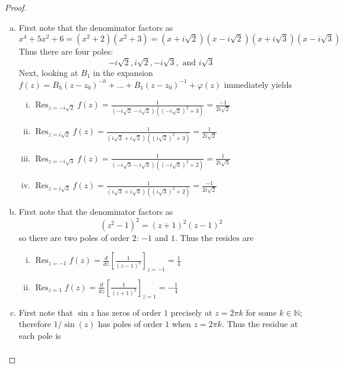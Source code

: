\documentclass{article}
\begin{document}
\begin{proof} \text{} \\
  \begin{enumerate}[(a)]
    \item First note that the denominator factors as \[
      x^4 + 5x^2 + 6 = (x^2 + 2)(x^2 + 3) = (x + i\sqrt{2})(x - i\sqrt{2})(x + i\sqrt{3})(x - i\sqrt{3})
    \] Thus there are four poles: \[
      -i\sqrt{2}, i\sqrt{2}, -i\sqrt{3}, \text{ and } i\sqrt{3}
    \]
    Next, looking at $B_1$ in the expansion
      $f(z) = B_h(z-z_0)^{-h} + \hdots + B_1(z-z_0)^{-1} + \varphi(z)$
    immediately yields \begin{enumerate}[(i)]
      \item $\displaystyle
        \operatorname{Res}_{z=-i\sqrt{2}}f(z)
          = \frac{1}{(-i\sqrt{2} - i\sqrt{2})((-i\sqrt{2})^2 + 3)}
          = \frac{-1}{2i\sqrt{2}}
      $
      \item $\displaystyle
        \operatorname{Res}_{z=i\sqrt{2}}f(z)
          = \frac{1}{(i\sqrt{2} + i\sqrt{2})((i\sqrt{2})^2 + 3)}
          = \frac{1}{2i\sqrt{2}}
      $
      \item $\displaystyle
        \operatorname{Res}_{z=-i\sqrt{3}}f(z)
          = \frac{1}{(-i\sqrt{3} - i\sqrt{3})((-i\sqrt{3})^2 + 2)}
          = \frac{1}{2i\sqrt{3}}
      $
      \item $\displaystyle
        \operatorname{Res}_{z=i\sqrt{3}}f(z)
          = \frac{1}{(i\sqrt{3} + i\sqrt{3})((i\sqrt{3})^2 + 2)}
          = \frac{-1}{2i\sqrt{2}}
      $
    \end{enumerate}
    \item First note that the denominator factors as \[
      (z^2 - 1)^2 = (z + 1)^2(z-1)^2
    \] so there are two poles of order $2$: $-1$ and $1$. Thus the resides are
    \begin{enumerate}[(i)]
      \item $\displaystyle
        \operatorname{Res}_{z=-1}f(z)
        = \frac{d}{dz}\left[\frac{1}{(z - 1)^2}\right]_{z = -1}
        = \frac{1}{4}
      $
      \item $\displaystyle
        \operatorname{Res}_{z=1}f(z)
        = \frac{d}{dz}\left[\frac{1}{(z + 1)^2}\right]_{z = 1}
        = -\frac{1}{4}
      $
    \end{enumerate}
    \item First note that $\sin z$ has
      zeros of order $1$ precisely at $z = 2\pi k$ for some $k \in \mathbb{N}$;
      therefore $1/\sin(z)$ has poles of order $1$ when $z = 2\pi k$.
      Thus the residue at each pole is \begin{align*}

\end{align*}
\end{enumerate}
\end{proof}
\end{document}
